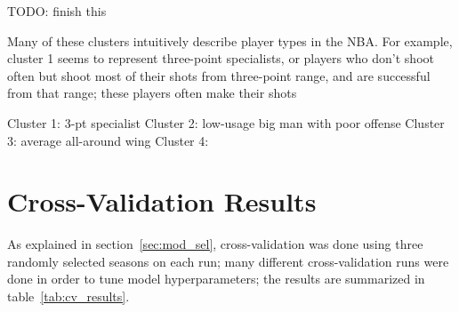 TODO: finish this

Many of these clusters intuitively describe player types in the NBA. For example,
cluster 1 seems to represent three-point specialists, or players who don't shoot
often but shoot most of their shots from three-point range, and are successful from
that range; these players often make their shots 

Cluster 1: 3-pt specialist
Cluster 2: low-usage big man with poor offense
Cluster 3: average all-around wing
Cluster 4: 

\section{Cross-Validation Results}

As explained in section~\ref{sec:mod_sel}, cross-validation was done using three
randomly selected seasons on each run; many different cross-validation runs were
done in order to tune model hyperparameters; the results are summarized in
table~\ref{tab:cv_results}.

\begin{table}
    \centering
    \noindent{}
    \caption{A summary of the results of hyperparameter tuning and
    cross-validation.}
    \label{tab:cv_results}
\end{table}

